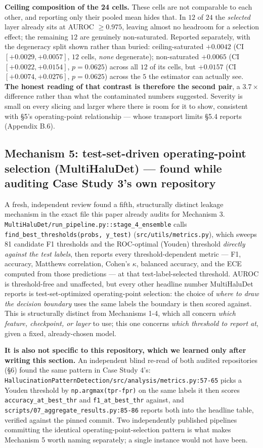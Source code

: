 \documentclass[10pt]{article} %
\begin{document}
\textbf{Ceiling composition of the 24 cells.} These cells are not comparable to
each other, and reporting only their pooled mean hides that. In $12$ of $24$
the \emph{selected} layer already sits at AUROC $\geq0.975$, leaving almost no
headroom for a selection effect; the remaining $12$ are genuinely
non-saturated. Reported separately, with the degeneracy split shown rather than
buried: ceiling-saturated $+0.0042$ (CI $[+0.0029,+0.0057]$, $12$ cells,
\emph{none} degenerate); non-saturated $+0.0065$ (CI $[+0.0022,+0.0154]$,
$p=0.0625$) across all $12$ of its cells, but $+0.0157$ (CI
$[+0.0074,+0.0276]$, $p=0.0625$) across the $5$ the estimator can actually see.
\textbf{The honest reading of that contrast is therefore the second pair}, a
$3.7\times$ difference rather than what the contaminated numbers suggested.
Severity is small on every slicing and larger where there is room for it to
show, consistent with §5's operating-point relationship --- whose transport
limits §5.4 reports (Appendix B.6).

\subsection{Mechanism 5: test-set-driven operating-point selection (MultiHaluDet) --- found while auditing Case Study 3's own repository}

A fresh, independent review found a fifth, structurally distinct leakage
mechanism in the exact file this paper already audits for Mechanism 3.
\texttt{MultiHaluDet/run\_pipeline.py::stage\_4\_ensemble} calls
\texttt{find\_best\_thresholds(probs, y\_test)} (\texttt{src/utils/metrics.py}),
which sweeps 81 candidate F1
thresholds and the ROC-optimal (Youden) threshold \emph{directly against the
test labels}, then reports every threshold-dependent metric --- F1, accuracy,
Matthews correlation, Cohen's $\kappa$, balanced accuracy, and the ECE computed
from those predictions --- at that test-label-selected threshold. AUROC is
threshold-free and unaffected, but every other headline number MultiHaluDet
reports is test-set-optimized operating-point selection: the choice of
\emph{where to draw the decision boundary} uses the same labels the boundary is
then scored against. This is structurally distinct from Mechanisms 1-4, which
all concern \emph{which feature, checkpoint, or layer} to use; this one
concerns \emph{which threshold to report at}, given a fixed, already-chosen
model.

\textbf{It is also not specific to this repository, which we learned only
after writing this section.} An independent blind re-read of both audited
repositories (§6) found the same pattern in Case Study 4's:
\texttt{HallucinationPatternDetection/src/analysis/metrics.py:57-65} picks a
Youden threshold by \texttt{np.argmax(tpr-fpr)} on the same labels it then
scores \texttt{accuracy\_at\_best\_thr} and \texttt{f1\_at\_best\_thr} against,
and \texttt{scripts/07\_aggregate\_results.py:85-86} reports both into the
headline table, verified against the pinned commit. Two independently published
pipelines committing the identical operating-point-selection pattern is what
makes Mechanism 5 worth naming separately; a single instance would not have
been.
\end{document}

